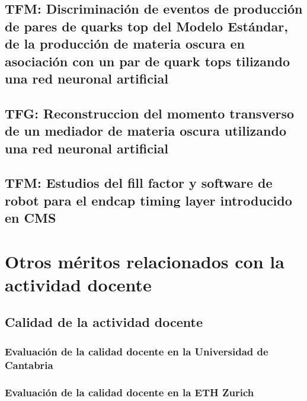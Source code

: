 \documentclass[a4paper, 11pt, twoside, openright]{report}
\begin{document}
\subsection{TFM: Discriminación de eventos de producción de pares de quarks top del Modelo Estándar, de la producción de materia oscura en asociación con un par de quark tops tilizando una red neuronal artificial}


\subsection{TFG: Reconstruccion del momento transverso de un mediador de materia oscura utilizando una red neuronal artificial}


\subsection{TFM: Estudios del fill factor y software de robot para el endcap timing layer introducido en CMS}




\section{Otros méritos relacionados con la actividad docente}

\subsection{Calidad de la actividad docente}

\subsubsection{Evaluación de la calidad docente en la Universidad de Cantabria}


\subsubsection{Evaluación de la calidad docente en la ETH Zurich}

\end{document}
